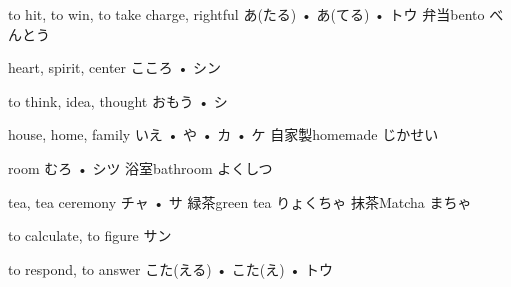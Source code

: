 



\setcounter{cardnum}{33}

		{to hit, to win, to take charge, rightful}
		{あ(たる) • あ(てる) • トウ}
		{弁当}{bento べんとう}
		{}{}
		{}{}
		{}{}
		{}{}

		{heart, spirit, center}
		{こころ • シン}
		{}{}
		{}{}
		{}{}
		{}{}
		{}{}

		{to think, idea, thought}
		{おもう • シ}
		{}{}
		{}{}
		{}{}
		{}{}
		{}{}

		{house, home, family}
		{いえ • や • カ • ケ}
		{自家製}{homemade じかせい}
		{}{}
		{}{}
		{}{}
		{}{}

		{room}
		{むろ • シツ}
		{浴室}{bathroom よくしつ}
		{}{}
		{}{}
		{}{}
		{}{}

		{tea, tea ceremony}
		{チャ • サ}
		{緑茶}{green tea りょくちゃ}
		{抹茶}{Matcha まちゃ}
		{}{}
		{}{}
		{}{}

		{to calculate, to figure}
		{サン}
		{}{}
		{}{}
		{}{}
		{}{}
		{}{}

		{to respond, to answer}
		{こた(える) • こた(え) • トウ}
		{}{}
		{}{}
		{}{}
		{}{}
		{}{}

